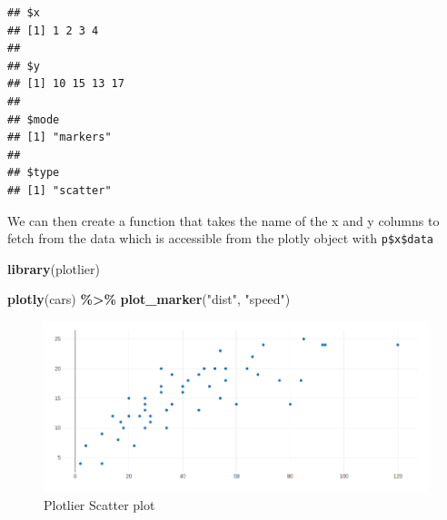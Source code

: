 \documentclass[
]{krantz}
\makeatletter
\newenvironment{Shaded}{\begin{snugshade}}{\end{snugshade}}
\newcommand{\CommentTok}[1]{\textcolor[rgb]{0.37,0.37,0.37}{\textit{#1}}}
\newcommand{\ControlFlowTok}[1]{\textcolor[rgb]{0.27,0.27,0.27}{\textbf{#1}}}
\newcommand{\DataTypeTok}[1]{\textcolor[rgb]{0.27,0.27,0.27}{#1}}
\newcommand{\KeywordTok}[1]{\textcolor[rgb]{0.27,0.27,0.27}{\textbf{#1}}}
\newcommand{\NormalTok}[1]{#1}
\newcommand{\OperatorTok}[1]{\textcolor[rgb]{0.43,0.43,0.43}{\textbf{#1}}}
\newcommand{\StringTok}[1]{\textcolor[rgb]{0.5,0.5,0.5}{#1}}
\newenvironment{kframe}{%
\medskip{}
\setlength{\fboxsep}{.8em}
 \def\at@end@of@kframe{}%
 \ifinner\ifhmode%
  \def\at@end@of@kframe{\end{minipage}}%
  \begin{minipage}{\columnwidth}%
 \fi\fi%
 \def\FrameCommand##1{\hskip\@totalleftmargin \hskip-\fboxsep
 \colorbox{shadecolor}{##1}\hskip-\fboxsep
     \hskip-\linewidth \hskip-\@totalleftmargin \hskip\columnwidth}%
 \MakeFramed {\advance\hsize-\width
   \@totalleftmargin\z@ \linewidth\hsize
   \@setminipage}}%
 {\par\unskip\endMakeFramed%
 \at@end@of@kframe}
\renewenvironment{Shaded}{\begin{kframe}}{\end{kframe}}
\makeatother
\begin{document}
\begin{verbatim}
## $x
## [1] 1 2 3 4
## 
## $y
## [1] 10 15 13 17
## 
## $mode
## [1] "markers"
## 
## $type
## [1] "scatter"
\end{verbatim}

We can then create a function that takes the name of the x and y columns to fetch from the data which is accessible from the plotly object with \texttt{p\$x\$data}

\begin{Shaded}
\end{Shaded}

\begin{Shaded}
\begin{Highlighting}[]
\KeywordTok{library}\NormalTok{(plotlier)}

\KeywordTok{plotly}\NormalTok{(cars) }\OperatorTok{\%>\%}\StringTok{ }
\StringTok{  }\KeywordTok{plot\_marker}\NormalTok{(}\StringTok{"dist"}\NormalTok{, }\StringTok{"speed"}\NormalTok{)}
\end{Highlighting}
\end{Shaded}

\begin{figure}
\centering
\includegraphics{images/plotlier-scatter.png}
\caption{Plotlier Scatter plot}
\end{figure}
\end{document}
